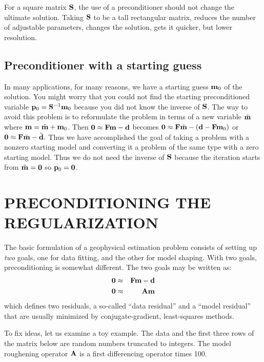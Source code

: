 \par
For a square matrix $\bold S$,
the use of a preconditioner should not change the ultimate solution.
Taking $\bold S$ to be a tall rectangular matrix,
reduces the number of adjustable parameters,
changes the solution,
gets it quicker, but lower resolution.



\subsection{Preconditioner with a starting guess}

In many applications, for many reasons,
we have a starting guess $\bold m_0$ of the solution.
You might worry that
you could not find the starting preconditioned variable 
$\bold p_0= \bold S^{-1}\bold m_0$
because you did not know the inverse of $\bold S$.
The way to avoid this problem is to
reformulate the problem
in terms of a new variable $\tilde {\bold m}$
where
$ \bold m = \tilde {\bold m} + \bold m_0$.
Then 
$\bold 0\approx \bold F \bold m - \bold d$
becomes
$\bold 0\approx \bold F \tilde {\bold m} - (\bold d - \bold F \bold m_0)$
or
$\bold 0\approx \bold F \tilde {\bold m} - \tilde {\bold d}.$
Thus we have accomplished the goal of taking
a problem with a nonzero starting model
and converting it a problem of the same type
with a zero starting model.
Thus we do not need the inverse of $\bold S$
because the iteration starts from $\tilde {\bold m}=\bold 0$
so $\bold p_0 = \bold 0$.



\section{PRECONDITIONING THE REGULARIZATION}


\par
The basic formulation of a geophysical estimation problem
consists of setting up
{\em  two}
goals,
one for data fitting,
and the other for model shaping.
With two goals, preconditioning is somewhat different.
The two goals may be written as:
\begin{eqnarray}
\bold 0 &\approx& \bold F \bold m - \bold d \\
\bold 0 &\approx& \bold A \bold m
\end{eqnarray}
which defines two residuals,
a so-called ``data residual'' and a ``model residual'' that
are usually minimized by conjugate-gradient, least-squares methods.
\par
To fix ideas, let us examine a toy example.
The data and the first three rows of the matrix below
are random numbers truncated to integers.
The model roughening operator $\bold A$
is a first differencing operator times 100.

